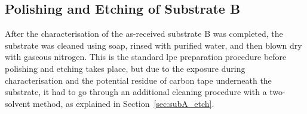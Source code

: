 \subsection{Polishing and Etching of Substrate B}

After the characterisation of the as-received substrate B was completed, the substrate was cleaned using soap, rinsed with purified water, and then blown dry with gaseous nitrogen. This is the standard \ac{lpe} preparation procedure before polishing and etching takes place, but due to the exposure during characterisation and the potential residue of carbon tape underneath the substrate, it had to go through an additional cleaning procedure with a two-solvent method, as explained in Section~\ref{sec:subA_etch}.%

%


